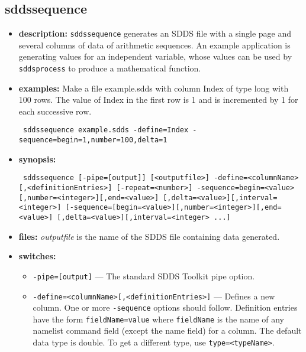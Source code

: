 \begin{latexonly}
\newpage
\end{latexonly}
\subsection{sddssequence}
\label{sddssequence}

\begin{itemize}
\item {\bf description:} 
{\tt sddssequence} generates an SDDS file with a single page and several columns of data
of arithmetic sequences. An example application is 
generating values for an independent variable, whose values can be used by 
{\tt sddsprocess} to produce a mathematical function.
\item {\bf examples:} 
Make a file example.sdds with column Index of type long with 100 rows. The value of Index in the first row
is 1 and is incremented by 1 for each successive row.
\begin{flushleft}{\tt
sddssequence example.sdds -define=Index -sequence=begin=1,number=100,delta=1
}\end{flushleft}
\item {\bf synopsis:} 
\begin{flushleft}{\tt
sddssequence [-pipe=[output]] [<outputfile>]
-define=<columnName>[,<definitionEntries>] [-repeat=<number>]
-sequence=begin=<value>[,number=<integer>][,end=<value>]
    [,delta=<value>][,interval=<integer>]
[-sequence=[begin=<value>][,number=<integer>][,end=<value>]
    [,delta=<value>][,interval=<integer> ...]
}\end{flushleft}

\item {\bf files:}
{\em outputfile} is the name of the SDDS file containing data generated.

\item {\bf switches:}
    \begin{itemize}
    \item {\tt -pipe=[output]} --- The standard SDDS Toolkit pipe option.
    \item {\tt -define=<columnName>[,<definitionEntries>]} --- Defines a new column.
        One or more {\tt -sequence} options should follow. 
        Definition entries have the form {\tt fieldName=value}
        where {\tt fieldName} is the name of any namelist
        command field (except the name field) for a column. The default data type is double.
        To get a different type, use {\tt type=<typeName>}.


\end{itemize}
\end{itemize}
